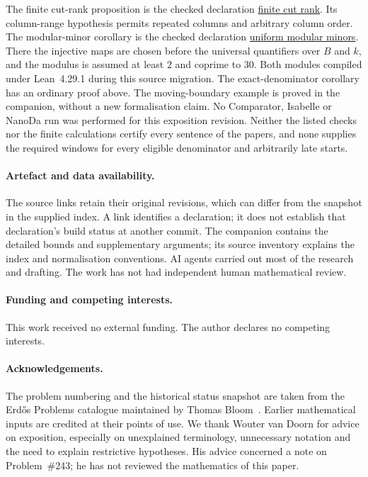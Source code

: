 \documentclass[11pt]{article}
\begin{document}
The finite cut-rank proposition is the checked declaration
\href{https://github.com/wcook04/plectis-erdos/blob/d11bd0b16f2c0b68d722777762ebbd4f96a12db8/lean/ErdosProblems/Erdos269/PaperR7FiniteCutRank.lean#L182}{finite cut rank}.
Its column-range hypothesis permits repeated columns and arbitrary column
order.  The modular-minor corollary is the checked declaration
\href{https://github.com/wcook04/plectis-erdos/blob/d11bd0b16f2c0b68d722777762ebbd4f96a12db8/lean/ErdosProblems/Erdos269/PaperR7ModularMinors.lean#L133}{uniform modular minors}.
There the injective maps are chosen before the universal quantifiers over
$B$ and $k$, and the modulus is assumed at least $2$ and coprime to $30$.
Both modules compiled under Lean~4.29.1 during this source migration.
The exact-denominator corollary has an ordinary proof above.  The
moving-boundary example is proved in the companion, without a new
formalisation claim.  No Comparator, Isabelle or NanoDa run was performed
for this exposition revision.  Neither the listed checks nor
the finite calculations certify every sentence of the papers, and none
supplies the required windows for every eligible denominator and
arbitrarily late starts.

\paragraph{Artefact and data availability.}
The source links retain their original revisions, which can differ from
the snapshot in the supplied index.  A link identifies a declaration;
it does not establish that declaration's build status at another commit.
The companion contains the detailed bounds and supplementary arguments;
its source inventory explains the index and normalisation conventions.  AI agents carried out most of the research
and drafting.  The work has not had independent human mathematical
review.

\paragraph{Funding and competing interests.} This work received no external
funding.  The author declares no competing interests.
\paragraph{Acknowledgements.} The problem numbering and the historical
status snapshot are taken from the Erd\H{o}s Problems catalogue maintained
by Thomas Bloom~\cite{erdosproblems}.  Earlier mathematical inputs are
credited at their points of use.  We thank Wouter van Doorn for advice on
exposition, especially on unexplained terminology, unnecessary notation
and the need to explain restrictive hypotheses.  His advice concerned a
note on Problem~\#243; he has not reviewed the mathematics of this paper.
\end{document}
